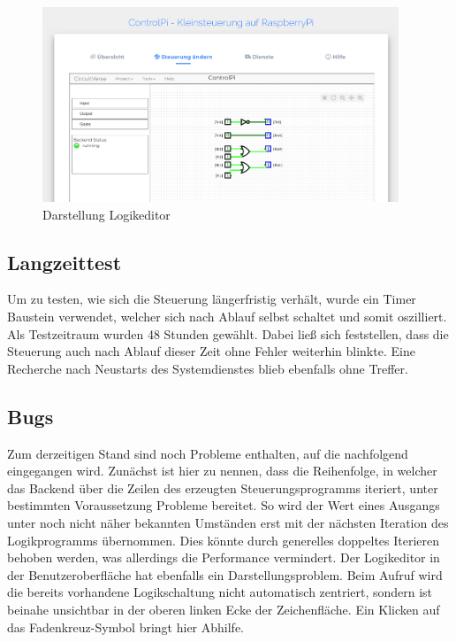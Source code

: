  \begin{figure}[H]
	\begin{center}
		\includegraphics[width=0.95\textwidth]{./images/FrontendAendern.png}
		\caption{Darstellung Logikeditor}
		\label{img:FrontendAenderung}
	\end{center} 
\end{figure}	

\subsection{Langzeittest}
Um zu testen, wie sich die Steuerung längerfristig verhält, wurde ein Timer Baustein verwendet, welcher sich nach Ablauf selbst schaltet und somit oszilliert. Als Testzeitraum wurden 48 Stunden gewählt. Dabei ließ sich feststellen, dass die Steuerung auch nach Ablauf dieser Zeit ohne Fehler weiterhin blinkte. Eine Recherche nach Neustarts des Systemdienstes blieb ebenfalls ohne Treffer.    

 \subsection{Bugs}
 Zum derzeitigen Stand sind noch Probleme enthalten, auf die nachfolgend eingegangen wird. Zunächst ist hier zu nennen, dass die Reihenfolge, in welcher das Backend über die Zeilen des erzeugten Steuerungsprogramms iteriert, unter bestimmten Voraussetzung Probleme bereitet. So wird der Wert eines Ausgangs unter noch nicht näher bekannten Umständen erst mit der nächsten Iteration des Logikprogramms übernommen. Dies könnte durch generelles doppeltes Iterieren behoben werden, was allerdings die Performance vermindert. Der Logikeditor in der Benutzeroberfläche hat ebenfalls ein Darstellungsproblem. Beim Aufruf wird die bereits vorhandene Logikschaltung nicht automatisch zentriert, sondern ist beinahe unsichtbar in der oberen linken Ecke der Zeichenfläche. Ein Klicken auf das Fadenkreuz-Symbol bringt hier Abhilfe.  
 
